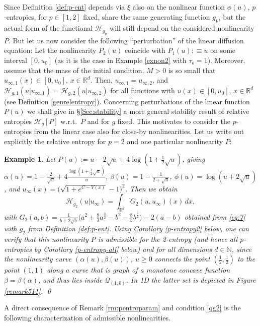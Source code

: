 \documentclass[reqno]{amsart}
\newtheorem{example}[lemma]{Example}
\newcommand{\R}{\mathbb{R}}
\newcommand{\N}{\mathbb{N}}
\renewcommand{\H}{{\mathcal{H}}}
\begin{document}
Since Definition \ref{def:p-ent} depends via $\xi$ also on the nonlinear function $\phi(u)$, $p$-entropies, for $p\in [1,2]$ fixed, share the same generating function $g_p$, but the actual form of the functional $\H_{g_p}$ will still depend on the considered nonlinearity $P$. 
But let us now consider the following ``perturbation'' of the linear diffusion equation: Let the nonlinearity $P_2(u)$ coincide with $P_1(u):\equiv u$ on some interval $[0,u_0]$ (as it is the case in Example \ref{exnon2} with $\tau_o=1$). Moreover, assume that the mass of the initial condition, $M>0$ is so small that $u_{\infty,1}(x)\in[0,u_0],\,x\in\R^d$. Then, $u_{\infty,1}=u_{\infty,2}$, and $\H_{g,1}(u|u_{\infty,1})=\H_{g,2}(u|u_{\infty,2})$ for all functions with $u(x)\in[0,u_0],\,x\in\R^d$ (see Definition \ref{genrelentropy}). 
Concerning perturbations of the linear function $P(u)$ we shall give in \S \ref{Sec:stability} a more general stability result of relative entropies $\H_g[P]$ w.r.t.\ $P$ and for $g$ fixed. This motivates to consider the $p$-entropies from the linear case also for close-by nonlinearities. Let us write out explicitly the relative entropy for $p=2$ and one particular nonlinearity $P$:

\begin{example}
Let $P(u):=u-2\sqrt u+4\log(1+\frac12 \sqrt u)$, giving $\alpha(u)=1-\frac2{\sqrt u} +4\frac{\log(1+\frac12 \sqrt u)}{u}$, $\beta(u)=1-\frac{1}{2+\sqrt{u}}$, $\phi(u)=\log(u+2\sqrt u)$, and $u_\infty(x)=\big(\sqrt{1+e^{C-V(x)}}-1\big)^2$. Then we obtain
$$
  \H_{g_2}(u|u_\infty)=\int_{\R^d} G_2(u,u_\infty)(x)\,dx,
$$
with $G_2(a,b)=\frac{1}{b+2\sqrt b}\big(a^2+\frac{8}{3}a^{\frac32}-b^2-\frac{8}{3}b^{\frac32}\big)-2(a-b)$ obtained from \eqref{eq:7} with $g_2$ from Definition \ref{def:p-ent}. Using Corollary \ref{p-entropy2} below, one can verify that this nonlinearity $P$ is admissible for the 2-entropy (and hence all $p$-entropies by Corollary \ref{p-entropy-all} below) and for all dimensions $d\in\N$, since the nonlinearity curve $(\alpha(u),\beta(u))$, $u\ge0$ connects the point $(\frac12,\frac12)$ to the point $(1,1)$ along a curve that is graph of a monotone concave function $\beta=\beta(\alpha)$, and thus lies inside $\mathcal{Q}_{(1,0)}$. In 1D the latter set is depicted in Figure \ref{remark511}.
\qed  
\end{example}


A direct consequence of Remark \ref{rm:pentroparam} and condition \eqref{qg2} is the following characterization of admissible nonlinearities.
\end{document}
